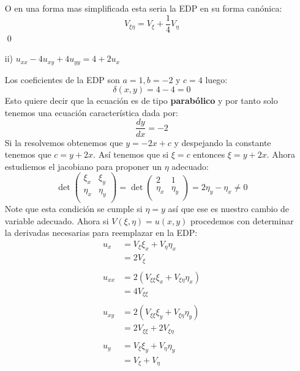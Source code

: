 \begin{homeworkProblem}
\begin{itemize}
\begin{solucion}
             O en una forma mas simplificada esta seria la EDP en su forma canónica:
             $$V_{\xi\eta}=V_\xi+\dfrac{1}{4}V_\eta$$
             \qed
        \end{solucion}
        \item[ii)] $u_{xx}-4u_{xy}+4u_{yy}=4+2u_x$
        \begin{solucion}
            Los coeficientes de la EDP son $a=1, b=-2$ y $c=4$ luego:
            $$\delta(x,y)=4-4=0$$
            Esto quiere decir que la ecuación es de tipo \textbf{parabólico} y por tanto solo tenemos una ecuación característica dada por:
            $$\dfrac{dy}{dx}=-2$$
            Si la resolvemos obtenemos que $y=-2x+c$ y despejando la constante tenemos que $c=y+2x$. Así tenemos que si $\xi=c$ entonces $\xi=y+2x$. Ahora estudiemos el jacobiano para proponer un $\eta$ adecuado:
            $$\det\begin{pmatrix}
                \xi_x & \xi_y \\
                \eta_x & \eta_y \\
            \end{pmatrix}=\det\begin{pmatrix}
               2 & 1 \\ 
               \eta_x & \eta_y \\
            \end{pmatrix}=2\eta_y-\eta_x\neq 0$$
            Note que esta condición se cumple si $\eta=y$ así que ese es nuestro cambio de variable adecuado. Ahora si $V(\xi,\eta)=u(x,y)$ procedemos con determinar la derivadas necesarias para reemplazar en la EDP:
            \begin{align*}
                u_x&=V_\xi \xi_x+V_\eta \eta_x\\
                 &=2V_\xi\\
                 \\
                 u_{xx}&=2(V_{\xi\xi}\xi_x+V_{\xi\eta}\eta_x)\\
                 &=4V_{\xi\xi}\\
                 \\
                 u_{xy}&=2(V_{\xi\xi}\xi_y+V_{\xi\eta}\eta_y)\\
                 &=2V_{\xi\xi}+2V_{\xi\eta}\\
                 \\
                 u_y&=V_\xi \xi_y+V_\eta \eta_y\\
                 &=V_\xi+V_\eta \\
                 \\

\end{align*}
\end{solucion}
\end{itemize}
\end{homeworkProblem}
